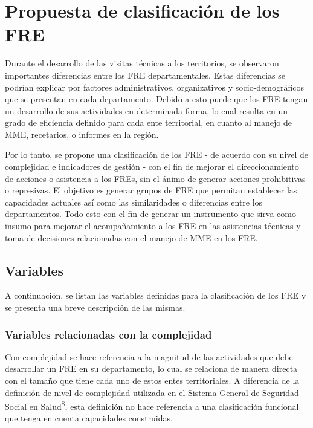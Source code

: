 \documentclass[
  oneside]{book}
\begin{document}
\hypertarget{propuesta-de-clasificaciuxf3n-de-los-fre}{%
\section{Propuesta de clasificación de los FRE}\label{propuesta-de-clasificaciuxf3n-de-los-fre}}

Durante el desarrollo de las visitas técnicas a los territorios, se observaron importantes diferencias entre los FRE departamentales. Estas diferencias se podrían explicar por factores administrativos, organizativos y socio-demográficos que se presentan en cada departamento. Debido a esto puede que los FRE tengan un desarrollo de sus actividades en determinada forma, lo cual resulta en un grado de eficiencia definido para cada ente territorial, en cuanto al manejo de MME, recetarios, o informes en la región.

Por lo tanto, se propone una clasificación de los FRE - de acuerdo con su nivel de complejidad e indicadores de gestión - con el fin de mejorar el direccionamiento de acciones o asistencia a los FREs, sin el ánimo de generar acciones prohibitivas o represivas. El objetivo es generar grupos de FRE que permitan establecer las capacidades actuales así como las similaridades o diferencias entre los departamentos. Todo esto con el fin de generar un instrumento que sirva como insumo para mejorar el acompañamiento a los FRE en las asistencias técnicas y toma de decisiones relacionadas con el manejo de MME en los FRE.

\hypertarget{variables}{%
\subsection{Variables}\label{variables}}

A continuación, se listan las variables definidas para la clasificación de los FRE y se presenta una breve descripción de las mismas.

\hypertarget{variables-relacionadas-con-la-complejidad}{%
\subsubsection{Variables relacionadas con la complejidad}\label{variables-relacionadas-con-la-complejidad}}

Con complejidad se hace referencia a la magnitud de las actividades que debe desarrollar un FRE en su departamento, lo cual se relaciona de manera directa con el tamaño que tiene cada uno de estos entes territoriales. A diferencia de la definición de nivel de complejidad utilizada en el Sistema General de Seguridad Social en Salud\textsuperscript{\protect\hyperlink{ref-MinisteriodeSalud1994}{8}}, esta definición no hace referencia a una clasificación funcional que tenga en cuenta capacidades construidas.
\end{document}
